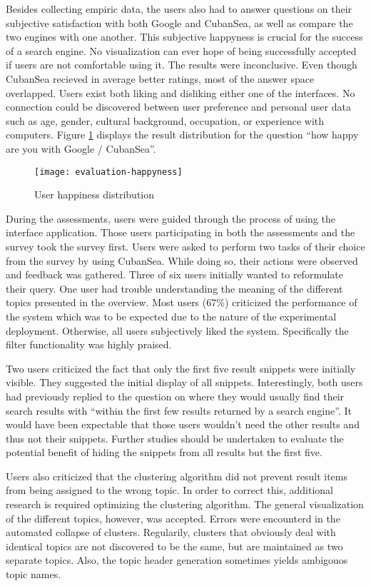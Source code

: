 Besides collecting empiric data, the users also had to answer questions on their subjective satisfaction with both Google and CubanSea, as well as compare the two engines with one another. This subjective happyness is crucial for the success of a search engine. No visualization can ever hope of being successfully accepted if users are not comfortable using it. The results were inconclusive. Even though CubanSea recieved in average better ratings, most of the answer space overlapped. Users exist both liking and disliking either one of the interfaces. No connection could be discovered between user preference and personal user data such as age, gender, cultural background, occupation, or experience with computers. Figure \ref{fig:eval:happyness} displays the result distribution for the question ``how happy are you with Google / CubanSea''.
\begin{figure}[!t]
	\centering
	\texttt{[image: evaluation-happyness]}
	\caption{User happiness distribution}
	\label{fig:eval:happyness}
\end{figure}

During the assessments, users were guided through the process of using the interface application. Those users participating in both the assessments and the survey took the survey first. Users were asked to perform two tasks of their choice from the survey by using CubanSea. While doing so, their actions were observed and feedback was gathered. Three of six users initially wanted to reformulate their query. One user had trouble understanding the meaning of the different topics presented in the overview. Most users (67\%) criticized the performance of the system which was to be expected due to the nature of the experimental deployment. Otherwise, all users subjectively liked the system. Specifically the filter functionality was highly praised.

Two users criticized the fact that only the first five result snippets were initially visible. They suggested the initial display of all snippets. Interestingly, both users had previously replied to the question on where they would usually find their search results with ``within the first few results returned by a search engine''. It would have been expectable that those users wouldn't need the other results and thus not their snippets. Further studies should be undertaken to evaluate the potential benefit of hiding the snippets from all results but the first five.

Users also criticized that the clustering algorithm did not prevent result items from being assigned to the wrong topic. In order to correct this, additional research is required optimizing the clustering algorithm. The general visualization of the different topics, however, was accepted. Errors were encounterd in the automated collapse of clusters. Regularily, clusters that obviously deal with identical topics are not discovered to be the same, but are maintained as two separate topics. Also, the topic header generation sometimes yields ambigouos topic names.

